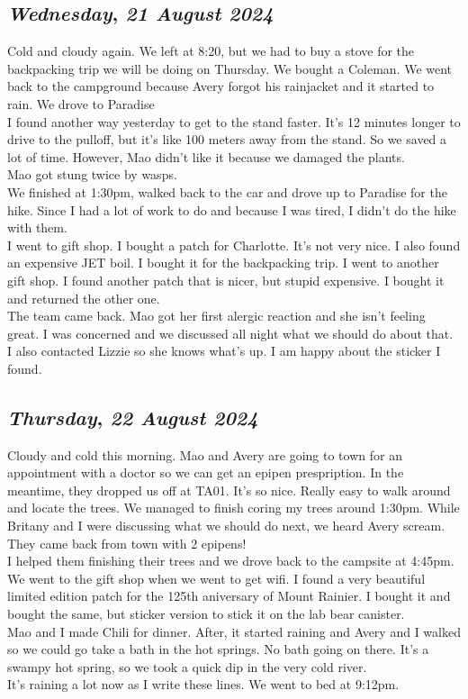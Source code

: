\def\day{\textit{21 August 2024}}
\def\weekday{\textit{Wednesday}}
\subsection*{\weekday, \day}
Cold and cloudy again. We left at 8:20, but we had to buy a stove for the backpacking trip we will be doing on Thursday. We bought a Coleman. We went back to the campground because Avery forgot his rainjacket and it started to rain. We drove to Paradise\\
I found another way yesterday to get to the stand faster. It's 12 minutes longer to drive to the pulloff, but it's like 100 meters away from the stand. So we saved a lot of time. However, Mao didn't like it because we damaged the plants.\\
Mao got stung twice by wasps.\\
We finished at 1:30pm, walked back to the car and drove up to Paradise for the hike. Since I had a lot of work to do and because I was tired, I didn't do the hike with them. \\
I went to gift shop. I bought a patch for Charlotte. It's not very nice. I also found an expensive JET boil. I bought it for the backpacking trip. I went to another gift shop. I found another patch that is nicer, but stupid expensive. I bought it and returned the other one. \\
The team came back. Mao got her first alergic reaction and she isn't feeling great. I was concerned and we discussed all night what we should do about that. I also contacted Lizzie so she knows what's up. I am happy about the sticker I found. 

\def\day{\textit{22 August 2024}}
\def\weekday{\textit{Thursday}}
\subsection*{\weekday, \day}
Cloudy and cold this morning. Mao and Avery are going to town for an appointment with a doctor so we can get an epipen prespription. In the meantime, they dropped us off at TA01. It's so nice. Really easy to walk around and locate the trees. We managed to finish coring my trees around 1:30pm. While Britany and I were discussing what we should do next, we heard Avery scream. They came back from town with 2 epipens! \\
I helped them finishing their trees and we drove back to the campsite at 4:45pm. We went to the gift shop when we went to get wifi. I found a very beautiful limited edition patch for the 125th aniversary of Mount Rainier. I bought it and bought the same, but sticker version to stick it on the lab bear canister. \\
Mao and I made Chili for dinner. After, it started raining and Avery and I walked so we could go take a bath in the hot springs. No bath going on there. It's a swampy hot spring, so we took a quick dip in the very cold river. \\
It's raining a lot now as I write these lines. We went to bed at 9:12pm. 

